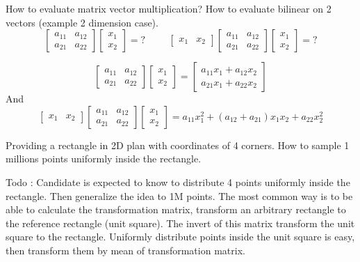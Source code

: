 \documentclass{exam}%
\begin{document}
\begin{questions}
\question How to evaluate matrix vector multiplication? How to evaluate bilinear on 2 vectors (example 2 dimension case).
\[
\left[ 
\begin{array}{cc}
a_{11} & a_{12}\\
a_{21} & a_{22}
\end{array} 
\right]
\left[ 
\begin{array}{c}
x_{1}\\
x_{2}
\end{array} 
\right]
=?
\hspace{1cm}
\left[ 
\begin{array}{cc}
x_{1} & x_{2}
\end{array} 
\right]
\left[ 
\begin{array}{cc}
a_{11} & a_{12}\\
a_{21} & a_{22}
\end{array} 
\right]
\left[ 
\begin{array}{c}
x_{1}\\
x_{2}
\end{array} 
\right]
=?
\]
\begin{solution}[.2in]
\[
\left[ 
\begin{array}{cc}
a_{11} & a_{12}\\
a_{21} & a_{22}
\end{array} 
\right]
\left[ 
\begin{array}{c}
x_{1}\\
x_{2}
\end{array} 
\right]
=
\left[ 
\begin{array}{c}
a_{11}x_1 + a_{12}x_2\\
a_{21}x_1 + a_{22}x_2
\end{array} 
\right]
\]
And
\[
\left[ 
\begin{array}{cc}
x_{1} & x_{2}
\end{array} 
\right]
\left[ 
\begin{array}{cc}
a_{11} & a_{12}\\
a_{21} & a_{22}
\end{array} 
\right]
\left[ 
\begin{array}{c}
x_{1}\\
x_{2}
\end{array} 
\right]
=
a_{11}x^2_1 + (a_{12}+a_{21})x_1x_2 + a_{22}x^2_2
\]
\end{solution}

\question Providing a rectangle in 2D plan with coordinates of 4 corners. How to sample 1 millions points uniformly inside the rectangle.
\begin{solution}[.2in]
Todo : Candidate is expected to know to distribute 4 points uniformly inside the rectangle. Then generalize the idea to 1M points. The most common way is to be able to calculate the transformation matrix, transform an arbitrary rectangle to the reference rectangle (unit square). The invert of this matrix transform the unit square to the rectangle. Uniformly distribute points inside the unit square is easy, then transform them by mean of transformation matrix.
\end{solution}


\end{questions}
\end{document}
